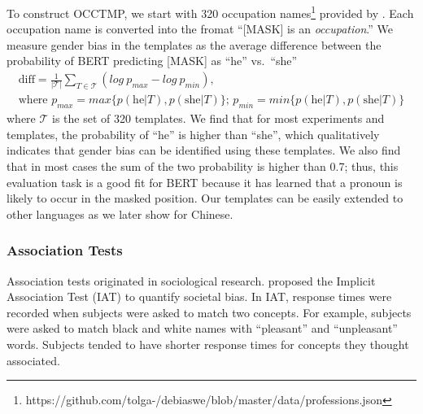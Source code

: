 To construct OCCTMP, we start with 320 occupation names\footnote{https://github.com/tolga-/debiaswe/blob/master/data/professions.json} provided by . Each occupation name is converted into the fromat ``[MASK] is an \textit{occupation}.''
We measure gender bias in the templates as the average difference between the probability of BERT predicting [MASK] as ``he'' vs.\ ``she''
\begin{gather*}
\text{diff}=\frac{1}{|{\mathcal T}|} \sum_{T \in
	{\mathcal T}}(log\ p_{max} - log\ p_{min}),\\
\mbox{where }p_{max}=max\{p(\mbox{he}| T),p(\mbox{she}| T)\} \mbox{; }p_{min}=min\{p(\mbox{he}| T),p(\mbox{she}| T)\}
\end{gather*}
where $\mathcal T$ is the set of 320 templates.  We find that for most experiments and templates, the probability of ``he'' is higher than ``she'', which qualitatively indicates that gender bias can be identified using these templates. We also find that in most cases the sum of the two probability is higher than 0.7; thus, this evaluation task is a good fit for BERT because it has learned that a pronoun is likely to occur in the masked position. Our templates can be easily extended to other languages as we later show for Chinese.

\subsubsection{Association Tests}\label{sec:weat}
Association tests originated in sociological research.  proposed the Implicit Association Test (IAT) to quantify societal bias. In IAT, response times were recorded when subjects were asked to match two concepts. For example, subjects were asked to match black and white names with “pleasant” and “unpleasant” words. Subjects tended to have shorter response times for concepts they thought associated. 


